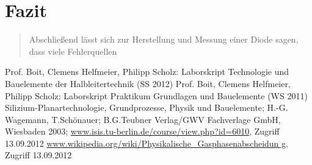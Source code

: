 \begin{quote}
\begin{quote}
        \end{quote}

\end{quote} %


\newpage

\section{Fazit}
\begin{quote}

    Abschließend lässt sich zur Herstellung und Messung einer Diode sagen, dass
    viele Fehlerquellen 

\end{quote}

\newpage

\begin{thebibliography}{999}




 Prof. Boit, Clemens Helfmeier, Philipp Scholz: Laborskript
Technologie und Bauelemente der Halbleitertechnik (SS 2012)
 Prof. Boit, Clemens Helfmeier, Philipp Scholz: Laborskript
Praktikum Grundlagen und Bauelemente (WS 2011)
 Silizium-Planartechnologie, Grundprozesse, Physik und
Bauelemente; H.-G. Wagemann, T.Schönauer; B.G.Teubner Verlag/GWV Fachverlage
GmbH, Wiesbaden 2003;
 \url{www.isis.tu-berlin.de/course/view.php?id=6010}, Zugriff
13.09.2012
 \url{www.wikipedia.org/wiki/Physikalische_Gasphasenabscheidun
g}, Zugriff 13.09.2012
\end{thebibliography}



\newpage

